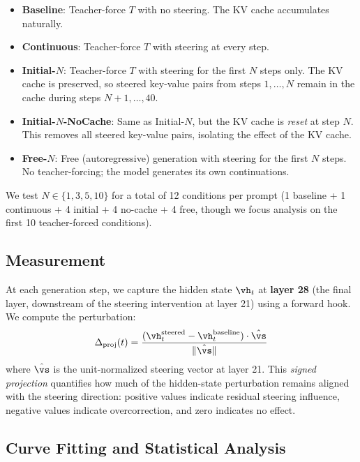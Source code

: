\begin{itemize}[leftmargin=*,itemsep=2pt,topsep=2pt]
\item \textbf{Baseline}: Teacher-force $T$ with no steering. The KV cache accumulates naturally.
\item \textbf{Continuous}: Teacher-force $T$ with steering at every step.
\item \textbf{Initial-$N$}: Teacher-force $T$ with steering for the first $N$ steps only. The KV cache is preserved, so steered key-value pairs from steps $1, \ldots, N$ remain in the cache during steps $N+1, \ldots, 40$.
\item \textbf{Initial-$N$-NoCache}: Same as Initial-$N$, but the KV cache is \emph{reset} at step $N$. This removes all steered key-value pairs, isolating the effect of the KV cache.
\item \textbf{Free-$N$}: Free (autoregressive) generation with steering for the first $N$ steps. No teacher-forcing; the model generates its own continuations.
\end{itemize}

We test $N \in \{1, 3, 5, 10\}$ for a total of 12 conditions per prompt (1 baseline + 1 continuous + 4 initial + 4 no-cache + 4 free, though we focus analysis on the first 10 teacher-forced conditions).

\subsection{Measurement}

At each generation step, we capture the hidden state $\vh_t$ at \textbf{layer 28} (the final layer, downstream of the steering intervention at layer 21) using a forward hook. We compute the perturbation:
\begin{equation}
\label{eq:delta}
\deltaprojection(t) = \frac{(\vh_t^{\mathrm{steered}} - \vh_t^{\mathrm{baseline}}) \cdot \hat{\steeringvec}}{\|\hat{\steeringvec}\|}
\end{equation}
where $\hat{\steeringvec}$ is the unit-normalized steering vector at layer 21. This \emph{signed projection} quantifies how much of the hidden-state perturbation remains aligned with the steering direction: positive values indicate residual steering influence, negative values indicate overcorrection, and zero indicates no effect.

\subsection{Curve Fitting and Statistical Analysis}

